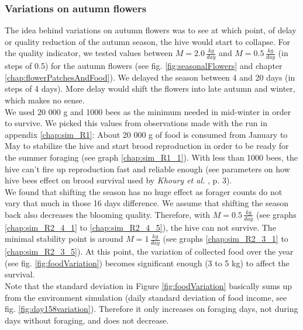 	\subsubsection{Variations on autumn flowers}
		\label{chap:variationsOnAutumnFlowers}
		The idea behind variations on autumn flowers was to see at which point, of delay or quality reduction of the autumn season, the hive would start to collapse. For the quality indicator, we tested values between $M = 2.0\,\frac{kg}{day}$ and $M = 0.5\,\frac{kg}{day}$ (in steps of 0.5) for the autumn flowers (see fig. \ref{fig:seasonalFlowers} and chapter \ref{chap:flowerPatchesAndFood}). We delayed the season between 4 and 20 days (in steps of 4 days). More delay would shift the flowers into late autumn and winter, which makes no sense.\\
		We used 20 000 g and 1000 bees as the minimum needed in mid-winter in order to survive. We picked this values from observations made with the run in appendix \ref{chap:sim_R1}: About 20 000 g of food is consumed from January to May to stabilize the hive and start brood reproduction in order to be ready for the summer foraging (see graph \ref{chap:sim_R1_1}). With less than 1000 bees, the hive can't fire up reproduction fast and reliable enough (see parameters on how hive bees effect on brood survival used by \textit{Khoury et al.} \cite{khoury13}, p. 3).\\
		We found that shifting the season has no huge effect as forager counts do not vary that much in those 16 days difference. We assume that shifting the season back also decreases the blooming quality. Therefore, with $M = 0.5\,\frac{kg}{day}$ (see graphs \ref{chap:sim_R2_4_1} to \ref{chap:sim_R2_4_5}), the hive can not survive. The minimal stability point is around $M = 1\,\frac{kg}{day}$ (see graphs \ref{chap:sim_R2_3_1} to \ref{chap:sim_R2_3_5}). At this point, the variation of collected food over the year (see fig. \ref{fig:foodVariation}) becomes significant enough (3 to 5 kg) to affect the survival.\\
		
		Note that the standard deviation in Figure \ref{fig:foodVariation} basically sums up from the environment simulation (daily standard deviation of food income, see fig. \ref{fig:day158variation}). Therefore it only increases on foraging days, not during days without foraging, and does not decrease.
		
